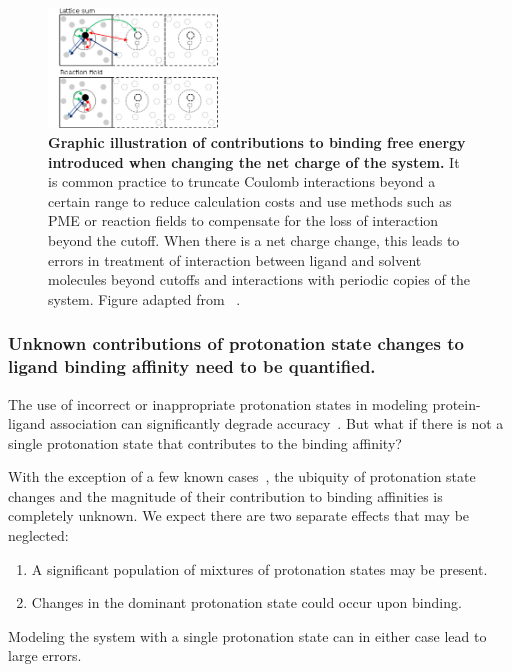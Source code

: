 \documentclass[10pt,final]{article}
\begin{document}
\begin{figure}[H]
  \centering
  \includegraphics[width=0.4\textwidth]{figures/reif_oostenbrink.png}
    \caption{\textbf{Graphic illustration of contributions to binding free energy introduced when changing the net charge of the system.}  It is common practice to truncate Coulomb interactions beyond a certain range to reduce calculation costs and use methods such as PME or reaction fields to compensate for the loss of interaction beyond the cutoff. When there is a net charge change, this leads to errors in treatment of interaction between ligand and solvent molecules beyond cutoffs and interactions with periodic copies of the system. Figure adapted from ~\textcite{Reif2013a}.}
  \label{figure:chargecorrections}
\end{figure}

\subsubsection*{Unknown contributions of protonation state changes to ligand binding affinity need to be quantified.}
The use of incorrect or inappropriate protonation states in modeling protein-ligand association can significantly degrade accuracy~\cite{Polgar2005a,Wittayanarakul2008a}.
But what if there is not a single protonation state that contributes to the binding affinity?

With the exception of a few known cases~\cite{Aleksandrov2007a,Czodrowski2007a,Steuber2007a,Czodrowski2007b},  %
the ubiquity of protonation state changes and the magnitude of their contribution to binding affinities is completely unknown. 
%
We expect there are two separate effects that may be neglected:
\begin{enumerate}
 \item A significant population of mixtures of protonation states may be present.
 \item Changes in the dominant protonation state could occur upon binding.
\end{enumerate}
%
Modeling the system with a single protonation state can in either case lead to large errors.
\end{document}
